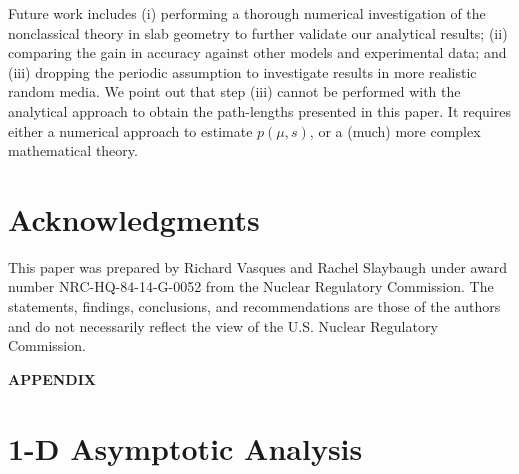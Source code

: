 \documentclass[12pt]{article}
\begin{document}
{Future work includes (i) performing a thorough numerical investigation of the nonclassical theory in slab geometry to further validate our analytical results; (ii) comparing the gain in accuracy against other models and experimental data; and (iii) dropping the periodic assumption to investigate results in more realistic random media. We
point out that step (iii) cannot be performed with the analytical approach to obtain the path-lengths presented
in this paper. It requires either a numerical approach to estimate $p(\mu,s)$, or a (much) more complex
mathematical theory.

\section*{Acknowledgments}

This paper was prepared by Richard Vasques and Rachel
Slaybaugh under award number NRC-HQ-84-14-G-0052 from
the Nuclear Regulatory Commission. The statements, findings,
conclusions, and recommendations are those of the authors
and do not necessarily reflect the view of the U.S. Nuclear
Regulatory Commission.

\appendix

\begin{center}
\textbf{APPENDIX}
\end{center}

\section{1-D Asymptotic Analysis}\label{appa}

}
\end{document}
